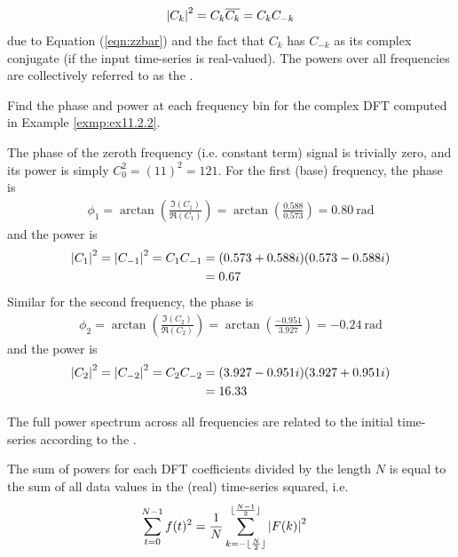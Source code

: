 \begin{align*}
\abs{C_k}^2 = C_k\overline{C_k} = C_kC_{-k}
\end{align*}
due to Equation (\ref{eqn:zzbar}) and the fact that $C_k$ has $C_{-k}$ as its complex conjugate (if the input time-series is real-valued). The powers over all frequencies are collectively referred to as the .

\begin{exmp}
Find the phase and power at each frequency bin for the complex DFT computed in Example \ref{exmp:ex11.2.2}.   
\end{exmp}
\begin{solution}
The phase of the zeroth frequency (i.e. constant term) signal is trivially zero, and its power is simply $C_0^2 = (11)^2 = 121$. For the first (base) frequency, the phase is
\begin{align*}
\phi_1 = \arctan(\frac{\Im(C_1)}{\Re(C_1)}) = \arctan(\frac{0.588}{0.573}) = \SI{0.80}{\radian}
\end{align*}
and the power is
\begin{align*}
\abs{C_1}^2 = \abs{C_{-1}}^2 = C_1C_{-1} &= (0.573 + 0.588i)(0.573 - 0.588i) \\
&= 0.67
\end{align*}
Similar for the second frequency, the phase is
\begin{align*}
\phi_2 = \arctan(\frac{\Im(C_2)}{\Re(C_2)}) = \arctan(\frac{-0.951}{3.927}) = \SI{-0.24}{\radian}
\end{align*}
and the power is
\begin{align*}
\abs{C_2}^2 = \abs{C_{-2}}^2 = C_2C_{-2} &= (3.927 - 0.951i)(3.927 + 0.951i) \\
&= 16.33
\end{align*}
\end{solution}
The full power spectrum across all frequencies are related to the initial time-series according to the .
\begin{thm}
\label{thm:DFTParseval}
The sum of powers for each DFT coefficients divided by the length $N$ is equal to the sum of all data values in the (real) time-series squared, i.e.\
\begin{align*}
\sum_{t=0}^{N-1} f(t)^2 &= \frac{1}{N} \sum_{k= -\lfloor \frac{N}{2} \rfloor}^{\lfloor \frac{N-1}{2} \rfloor} \abs{F(k)}^2
\end{align*}
\end{thm}
